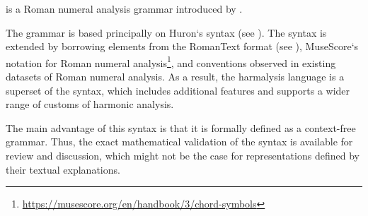  is a Roman numeral analysis grammar
introduced by \textcite{napoleslopez2020harmalysis}.

The  grammar is based principally on
Huron‘s  syntax (see ). The syntax
is extended by borrowing elements from the RomanText format
(see ), MuseScore‘s notation for Roman
numeral
analysis\footnote{\href{https://musescore.org/en/handbook/3/chord-symbols\#rna}{https://musescore.org/en/handbook/3/chord-symbols}},
and conventions observed in existing datasets of Roman
numeral analysis.  As  a result,  the harmalysis language is
a superset  of  the  syntax,  which includes
additional features and supports a wider range of customs of
harmonic analysis.

The main advantage of this syntax is that it is formally defined as a context-free grammar. Thus, the exact mathematical validation of the syntax is available for review and discussion, which might not be the case for representations defined by their textual explanations.
